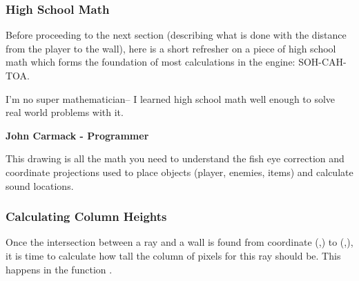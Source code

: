 \subsubsection{High School Math}
Before proceeding to the next section (describing what is done with the distance from the player to the wall), here is a short refresher on a piece of high school math which forms the foundation of most calculations in the engine: SOH-CAH-TOA.\\



\par
{}
\par
 \begin{fancyquotes}
  I'm no super mathematician-- I learned high school math well enough to solve real world problems with it.\\
 \par
\textbf{John Carmack - Programmer}
 \end{fancyquotes}
\par



This drawing is all the math you need to understand the fish eye correction and coordinate projections used to place objects (player, enemies, items) and calculate sound locations.\\






















\subsubsection{Calculating Column Heights}
Once the intersection between a ray and a wall is found from coordinate (,) to (,), it is time to calculate how tall the column of pixels for this ray should be. This happens in the function .\\

\begin{minipage}{\textwidth}

\end{minipage}

